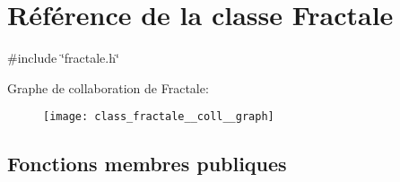 \hypertarget{class_fractale}{}\section{Référence de la classe Fractale}
\label{class_fractale}


{\ttfamily \#include \char`\"{}fractale.\+h\char`\"{}}



Graphe de collaboration de Fractale\+:\nopagebreak
\begin{figure}[H]
\begin{center}
\leavevmode
\texttt{[image: class\_fractale\_\_coll\_\_graph]}
\end{center}
\end{figure}
\subsection*{Fonctions membres publiques}
